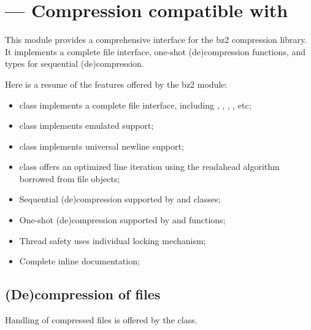 \section{ ---
         Compression compatible with }



This module provides a comprehensive interface for the bz2 compression library.
It implements a complete file interface, one-shot (de)compression functions,
and types for sequential (de)compression.

Here is a resume of the features offered by the bz2 module:

\begin{itemize}
\item {} class implements a complete file interface, including
      , ,
      , , etc;
\item {} class implements emulated  support;
\item {} class implements universal newline support;
\item {} class offers an optimized line iteration using
      the readahead algorithm borrowed from file objects;
\item Sequential (de)compression supported by  and
       classes;
\item One-shot (de)compression supported by  and
       functions;
\item Thread safety uses individual locking mechanism;
\item Complete inline documentation;
\end{itemize}


\subsection{(De)compression of files}

Handling of compressed files is offered by the  class.

